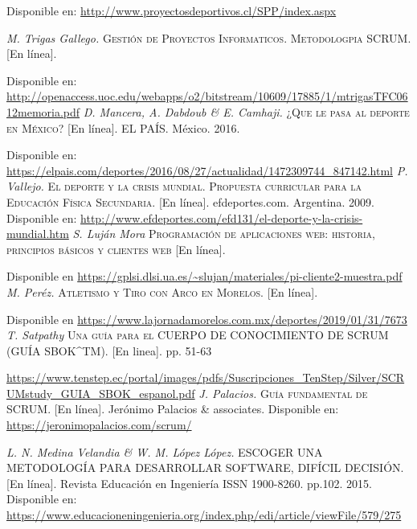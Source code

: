 \begin{thebibliography}{}
	\linebreak
	Disponible en:
	\url{http://www.proyectosdeportivos.cl/SPP/index.aspx}
	
	\textit{M. Trigas Gallego.}
	\textsc{Gestión de Proyectos Informaticos. Metodologpia SCRUM.} [En línea].
	
	\linebreak
	Disponible en: 
	\url{http://openaccess.uoc.edu/webapps/o2/bitstream/10609/17885/1/mtrigasTFC0612memoria.pdf}	
	\textit{D. Mancera, A. Dabdoub \& E. Camhaji.}
	\textsc{¿Que le pasa al deporte en México?} [En línea].
	EL PAÍS. México. 2016.
	
	\linebreak
	Disponible en: 
	\url{https://elpais.com/deportes/2016/08/27/actualidad/1472309744_847142.html}	
	\textit{P. Vallejo.}
	\textsc{El deporte y la crisis mundial. Propuesta curricular para la Educación Física Secundaria.} [En línea]. 
	efdeportes.com. Argentina. 2009.
	\linebreak
	Disponible en: 
	\url{http://www.efdeportes.com/efd131/el-deporte-y-la-crisis-mundial.htm}
	\textit{S. Luján Mora}
	\textsc{Programación de aplicaciones web: historia, principios básicos y clientes web} [En línea].
	
	\linebreak
	Disponible en 
	\url{https://gplsi.dlsi.ua.es/~slujan/materiales/pi-cliente2-muestra.pdf}
	\textit{M. Peréz.}
	\textsc{Atletismo y Tiro con Arco en Morelos.} [En línea].
	
	\linebreak
	Disponible en 
	\url{https://www.lajornadamorelos.com.mx/deportes/2019/01/31/7673}
	\textit{T. Satpathy}
	\textsc{Una guía para el CUERPO DE CONOCIMIENTO DE SCRUM (GUÍA SBOK^{TM}).} [En linea]. pp. 51-63 
	
	\linebreak
	\url{https://www.tenstep.ec/portal/images/pdfs/Suscripciones_TenStep/Silver/SCRUMstudy_GUIA_SBOK_espanol.pdf}
	\textit{J. Palacios.}
	\textsc{Guía fundamental de SCRUM.} [En línea]. 
	Jerónimo Palacios \& associates. 
	\linebreak
	Disponible en: 
	\url{https://jeronimopalacios.com/scrum/}
	
	\textit{L. N. Medina Velandia \& W. M. López López.}
	\textsc{ESCOGER UNA METODOLOGÍA PARA DESARROLLAR SOFTWARE, DIFÍCIL DECISIÓN.} [En línea]. 
	Revista Educación en Ingeniería ISSN 1900-8260. pp.102. 2015. 
	\linebreak
	Disponible en: 
	\url{https://www.educacioneningenieria.org/index.php/edi/article/viewFile/579/275}
	

\end{thebibliography}
